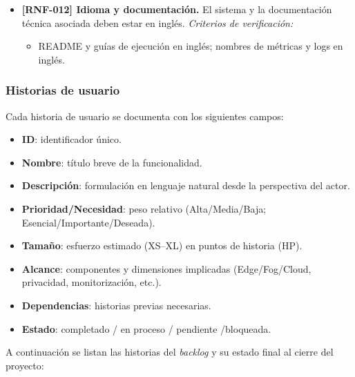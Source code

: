 \documentclass{report}
\begin{document}
\begin{itemize}
  \item \textbf{[RNF-012] Idioma y documentación.}  
  El sistema y la documentación técnica asociada deben estar en inglés.
  \textit{Criterios de verificación:}
  \begin{itemize}
    \item README y guías de ejecución en inglés; nombres de métricas y logs en inglés.
  \end{itemize}

\end{itemize}




\subsubsection{Historias de usuario}
\label{HistoriasdeUsuario}

Cada historia de usuario se documenta con los siguientes campos:

\begin{itemize}\setlength\itemsep{0.15em}
    \item \textbf{ID}: identificador único.
    \item \textbf{Nombre}: título breve de la funcionalidad.
    \item \textbf{Descripción}: formulación en lenguaje natural desde la perspectiva del actor.
    \item \textbf{Prioridad/Necesidad}: peso relativo (Alta/Media/Baja; Esencial/Importante/Deseada).
    \item \textbf{Tamaño}: esfuerzo estimado (XS--XL) en puntos de historia (HP).
    \item \textbf{Alcance}: componentes y dimensiones implicadas (Edge/Fog/Cloud, privacidad, monitorización, etc.).
    \item \textbf{Dependencias}: historias previas necesarias.
    \item \textbf{Estado}: completado / en proceso / pendiente /bloqueada.
\end{itemize}

A continuación se listan las historias del \textit{backlog} y su estado final al cierre del proyecto:
\end{document}
